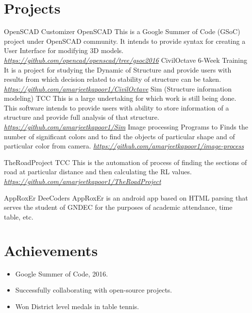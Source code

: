 \documentclass[]{friggeri-cv}
\begin{document}
\section{Projects}
\begin{entrylist}
  \entry
    {}
    {OpenSCAD Customizer}
    {OpenSCAD}
    {
        This is a Google Summer of Code (GSoC) project under OpenSCAD community. It intends to provide syntax for creating a User Interface for modifying 3D models.
        \textit{\href{https://github.com/openscad/openscad/tree/gsoc2016}{https://github.com/opencad/openscad/tree/gsoc2016}}
    }
  \entry
    {}
    {CivilOctave}
    {6-Week Training}
    {
        It is a project for studying the Dynamic of Structure and provide users with
results from which decision related to stability of structure can be taken.  
        \textit{\href{https://github.com/amarjeetkapoor1/CivilOctave}{https://github.com/amarjeetkapoor1/CivilOctave}}
    }
    \entry
    {}
    {Sim (Structure information modeling)}
    {TCC}
    {
       This is a large undertaking for which work is still being done. This software
intends to provide users with ability to store information of a structure and
provide full analysis of that structure.
        \textit{\href{https://github.com/amarjeetkapoor1/Sim}{https://github.com/amarjeetkapoor1/Sim}}
    }
    \entry
    {}
    {Image processing}
    {}
    {
    Programs to Finds the number of significant colors and to find the objects of
particular shape and of particular color from camera.
        \textit{\href{https://github.com/amarjeetkapoor1/image-process}{https://github.com/amarjeetkapoor1/image-process}}
    }
    
    \entry
    {}
    {TheRoadProject}
    {TCC}
    {
    This is the automation of process of finding the sections of road at particular
distance and then calculating the RL values.
    \textit{\href{https://github.com/amarjeetkapoor1/TheRoadProject}{ https://github.com/amarjeetkapoor1/TheRoadProject}
    }}
    
        \entry
    {}
    {AppRoxEr}
    {DeeCoders}
    {
     AppRoxEr is an android app based on HTML parsing that serves the student of GNDEC for the purposes of academic attendance, time table, etc.
    }
    
\end{entrylist}


\section{Achievements}
\begin{itemize}
\item Google Summer of Code, 2016.
\item Successfully collaborating with open-source projects. 
\item Won District level medals in table tennis.
\end{itemize}
\end{document}

